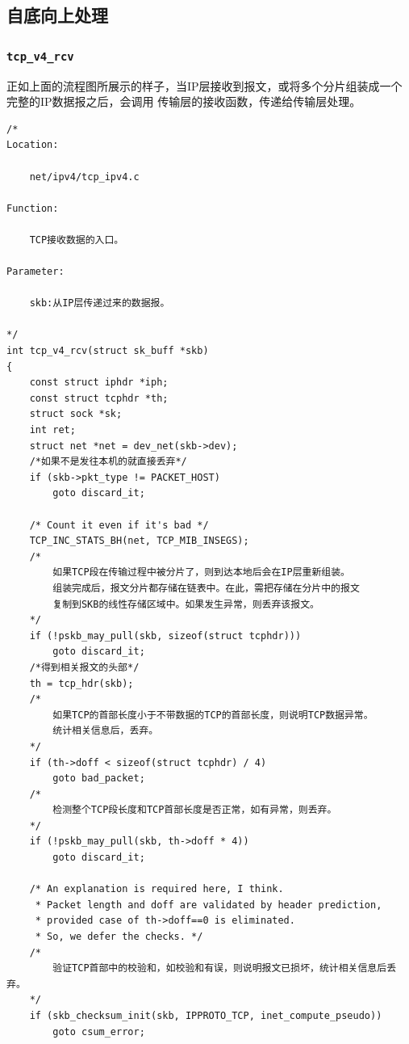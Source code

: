 		\subsection{自底向上处理}
			\subsubsection{\texttt{tcp_v4_rcv}}
				正如上面的流程图所展示的样子，当IP层接收到报文，或将多个分片组装成一个完整的IP数据报之后，会调用
				传输层的接收函数，传递给传输层处理。
\begin{verbatim}
/*
Location:

	net/ipv4/tcp_ipv4.c

Function:

	TCP接收数据的入口。

Parameter:

	skb:从IP层传递过来的数据报。

*/
int tcp_v4_rcv(struct sk_buff *skb)
{
	const struct iphdr *iph;
	const struct tcphdr *th;
	struct sock *sk;
	int ret;
	struct net *net = dev_net(skb->dev);
	/*如果不是发往本机的就直接丢弃*/
	if (skb->pkt_type != PACKET_HOST)
		goto discard_it;

	/* Count it even if it's bad */
	TCP_INC_STATS_BH(net, TCP_MIB_INSEGS);
	/*
		如果TCP段在传输过程中被分片了，则到达本地后会在IP层重新组装。
		组装完成后，报文分片都存储在链表中。在此，需把存储在分片中的报文
		复制到SKB的线性存储区域中。如果发生异常，则丢弃该报文。
	*/
	if (!pskb_may_pull(skb, sizeof(struct tcphdr)))
		goto discard_it;
	/*得到相关报文的头部*/
	th = tcp_hdr(skb);
	/*
		如果TCP的首部长度小于不带数据的TCP的首部长度，则说明TCP数据异常。
		统计相关信息后，丢弃。
	*/
	if (th->doff < sizeof(struct tcphdr) / 4)
		goto bad_packet;
	/*
		检测整个TCP段长度和TCP首部长度是否正常，如有异常，则丢弃。
	*/	
	if (!pskb_may_pull(skb, th->doff * 4))
		goto discard_it;

	/* An explanation is required here, I think.
	 * Packet length and doff are validated by header prediction,
	 * provided case of th->doff==0 is eliminated.
	 * So, we defer the checks. */
	/*
		验证TCP首部中的校验和，如校验和有误，则说明报文已损坏，统计相关信息后丢弃。
	*/
	if (skb_checksum_init(skb, IPPROTO_TCP, inet_compute_pseudo))
		goto csum_error;
\end{verbatim}

